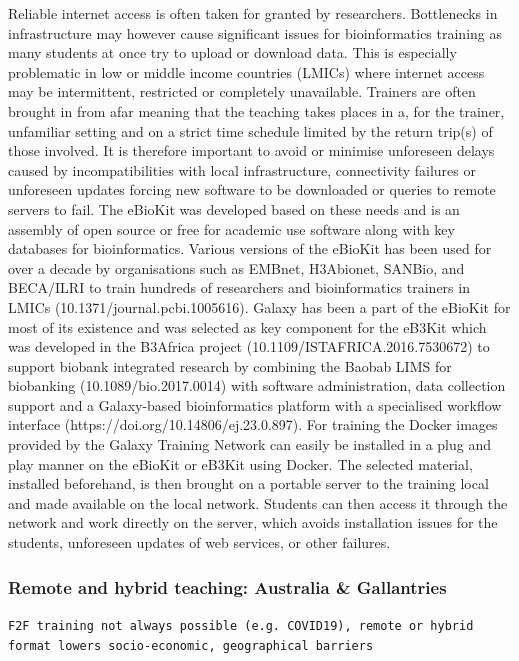 \documentclass[10pt,letterpaper]{article}
\begin{document}
Reliable internet access is often taken for granted by researchers.
Bottlenecks in infrastructure may however cause significant issues for bioinformatics training as many students at once try to upload or download data.
This is especially problematic in low or middle income countries (LMICs) where internet access may be intermittent, restricted or completely unavailable.
Trainers are often brought in from afar meaning that the teaching takes places in a, for the trainer, unfamiliar setting and on a strict time schedule limited by the return trip(s) of those involved.
It is therefore important to avoid or minimise unforeseen delays caused by incompatibilities with local infrastructure, connectivity failures or unforeseen updates forcing new software to be downloaded or queries to remote servers to fail.
The eBioKit was developed based on these needs and is an assembly of open source or free for academic use software along with key databases for bioinformatics.
Various versions of the eBioKit has been used for over a decade by organisations such as EMBnet, H3Abionet, SANBio, and BECA/ILRI to train hundreds of researchers and bioinformatics trainers in LMICs (10.1371/journal.pcbi.1005616).
Galaxy has been a part of the eBioKit for most of its existence and was selected as key component for the eB3Kit which was developed in the B3Africa project (10.1109/ISTAFRICA.2016.7530672) to support biobank integrated research by combining the Baobab LIMS for biobanking (10.1089/bio.2017.0014) with software administration, data collection support and a Galaxy-based bioinformatics platform with a specialised workflow interface (https://doi.org/10.14806/ej.23.0.897).
For training the Docker images provided by the Galaxy Training Network can easily be installed in a plug and play manner on the eBioKit or eB3Kit using Docker.
The selected material, installed beforehand, is then brought on a portable server to the training local and made available on the local network.
Students can then access it through the network and work directly on the server, which avoids installation issues for the students, unforeseen updates of web services, or other failures.


\subsubsection*{Remote and hybrid teaching: Australia \& Gallantries}

\verb+F2F training not always possible (e.g. COVID19), remote or hybrid format lowers socio-economic, geographical barriers+
\end{document}
